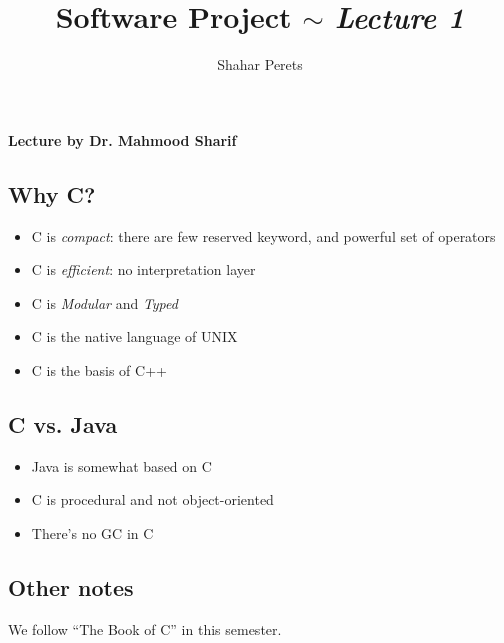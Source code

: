 \documentclass[]{../../../../tex/classes/styledArticle}
\author{Shahar Perets}
\title{Software Project $\sim$ \textit{Lecture 1}}
\begin{document}
	\maketitle
	
	\textbf{Lecture by Dr. Mahmood Sharif}
	
	\subsection*{Why C?}
	\begin{itemize}
		\item C is \textit{compact}: there are few reserved keyword, and powerful set of operators
		\item C is \textit{efficient}: no interpretation layer 
		\item C is \textit{Modular} and \textit{Typed}
		\item C is the native language of UNIX
		\item C is the basis of C++
	\end{itemize}
	
	\subsection*{C vs. Java}
	\begin{itemize}
		\item Java is somewhat based on C
		\item C is procedural and not object-oriented
		\item There's no GC in C
	\end{itemize}
	
	\subsection*{Other notes}
	We follow ``The Book of C'' in this semester. 
	
	
	
\end{document}
